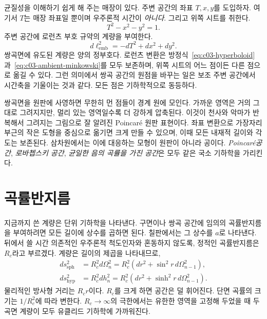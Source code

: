 균질성을 이해하기 쉽게 해 주는 매장이 있다. 주변 공간의 좌표 \(T,x,y\)를 도입하자. 여기서 \(T\)는 매장 좌표일 뿐이며 우주론적 시간이 \emph{아니다}. 그리고 위쪽 시트를 취한다.
\begin{equation}
T^2 - x^2 - y^2 = 1.
\label{eq:c03-hyperboloid}
\end{equation}
주변 공간에 로런츠 부호 규약의 계량을 부여한다.
\begin{equation}
d\ell_{\mathrm{emb}}^2=-dT^2+dx^2+dy^2.
\label{eq:c03-ambient-minkowski}
\end{equation}
쌍곡면에 유도된 계량은 양의 정부호다. 로런츠 변환은 방정식~\eqref{eq:c03-hyperboloid}과~\eqref{eq:c03-ambient-minkowski}를 모두 보존하며, 위쪽 시트의 어느 점이든 다른 점으로 옮길 수 있다. 그런 의미에서 쌍곡 공간의 원점을 바꾸는 일은 보조 주변 공간에서 시간축을 기울이는 것과 같다. 모든 점은 기하학적으로 동등하다.

쌍곡면을 원판에 사영하면 무한히 먼 점들이 경계 원에 모인다. 가까운 영역은 거의 그대로 그려지지만, 멀리 있는 영역일수록 더 강하게 압축된다. 이것이 천사와 악마가 반복해서 그려지는 그림으로 잘 알려진 Poincar\'e 원판 표현이다. 좌표 변환으로 가장자리 부근의 작은 도형을 중심으로 옮기면 크게 만들 수 있으며, 이때 모든 내재적 길이와 각도는 보존된다. 삼차원에서는 이에 대응하는 모형이 원판이 아니라 공이다. \emph{Poincar\'e공간}, \emph{로바쳅스키 공간}, \emph{균일한 음의 곡률을 가진 공간}은 모두 같은 국소 기하학을 가리킨다.

\begin{classroomqa}\end{classroomqa}

\section{곡률반지름}

지금까지 쓴 계량은 단위 기하학을 나타낸다. 구면이나 쌍곡 공간에 임의의 곡률반지름을 부여하려면 모든 길이에 상수를 곱하면 된다. 칠판에서는 그 상수를 \(a\)로 나타낸다. 뒤에서 쓸 시간 의존적인 우주론적 척도인자와 혼동하지 않도록, 정적인 곡률반지름은 \(R_c\)라고 부르겠다. 계량은 길이의 제곱을 나타내므로,
\begin{align}
ds_{\mathrm{sph}}^2
  &=R_c^2d\Omega_n^2
   =R_c^2\left(dr^2+\sin^2r\,d\Omega_{n-1}^2\right),\\
ds_{\mathrm{hyp}}^2
  &=R_c^2dh_n^2
   =R_c^2\left(dr^2+\sinh^2r\,d\Omega_{n-1}^2\right).
\label{eq:c03-scaled-curvature}
\end{align}
물리적인 방사형 거리는 \(R_cr\)이다. \(R_c\)를 크게 하면 공간은 덜 휘어진다. 단면 곡률의 크기는 \(1/R_c^2\)에 따라 변한다. \(R_c\to\infty\)의 극한에서는 유한한 영역을 고정해 두었을 때 두 곡면 계량이 모두 유클리드 기하학에 가까워진다.

